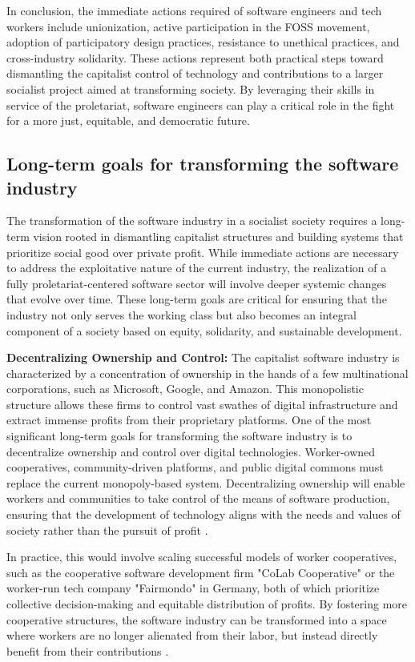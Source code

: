 \begin{refsection}
In conclusion, the immediate actions required of software engineers and tech workers include unionization, active participation in the FOSS movement, adoption of participatory design practices, resistance to unethical practices, and cross-industry solidarity. These actions represent both practical steps toward dismantling the capitalist control of technology and contributions to a larger socialist project aimed at transforming society. By leveraging their skills in service of the proletariat, software engineers can play a critical role in the fight for a more just, equitable, and democratic future.

\subsection{Long-term goals for transforming the software industry}

The transformation of the software industry in a socialist society requires a long-term vision rooted in dismantling capitalist structures and building systems that prioritize social good over private profit. While immediate actions are necessary to address the exploitative nature of the current industry, the realization of a fully proletariat-centered software sector will involve deeper systemic changes that evolve over time. These long-term goals are critical for ensuring that the industry not only serves the working class but also becomes an integral component of a society based on equity, solidarity, and sustainable development.

\textbf{Decentralizing Ownership and Control:}
The capitalist software industry is characterized by a concentration of ownership in the hands of a few multinational corporations, such as Microsoft, Google, and Amazon. This monopolistic structure allows these firms to control vast swathes of digital infrastructure and extract immense profits from their proprietary platforms. One of the most significant long-term goals for transforming the software industry is to decentralize ownership and control over digital technologies. Worker-owned cooperatives, community-driven platforms, and public digital commons must replace the current monopoly-based system. Decentralizing ownership will enable workers and communities to take control of the means of software production, ensuring that the development of technology aligns with the needs and values of society rather than the pursuit of profit \cite[pp.~140-143]{scholz2017}.

In practice, this would involve scaling successful models of worker cooperatives, such as the cooperative software development firm "CoLab Cooperative" or the worker-run tech company "Fairmondo" in Germany, both of which prioritize collective decision-making and equitable distribution of profits. By fostering more cooperative structures, the software industry can be transformed into a space where workers are no longer alienated from their labor, but instead directly benefit from their contributions \cite[pp.~65-67]{noble2018}.


\end{refsection}
